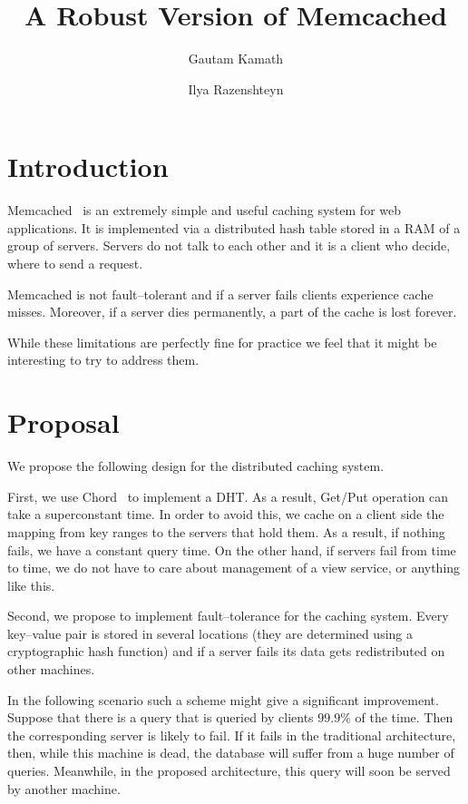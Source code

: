 \documentclass[letterpaper,11pt]{article}
\begin{document}
    \title{A Robust Version of Memcached}
    \author{Gautam Kamath \and Ilya Razenshteyn}
    \maketitle

    \section{Introduction}

    Memcached~\cite{} is an extremely simple and useful caching system for web applications. It is implemented
    via a distributed hash table stored in a RAM of a group of servers.
    Servers do not talk to each other and it is
    a client who decide, where to send a request.

    Memcached is not fault--tolerant and if a server fails clients experience cache misses. Moreover, if a server
    dies permanently, a part of the cache is lost forever.

    While these limitations are perfectly fine for practice we feel that it might be interesting
    to try to address them.

    \section{Proposal}

    We propose the following design for the distributed caching system.

    First, we use Chord~\cite{} to implement a DHT.
    As a result, Get/Put operation can take a superconstant time. In order to avoid this, we cache on a client 
    side the mapping from key ranges to the servers that hold them. As a result, if nothing fails, we have a
    constant query time. On the other hand, if servers fail from time to time,
    we do not have to care about management of a view service, or anything like this.

    Second, we propose to implement fault--tolerance for the caching system. Every key--value pair is stored in
    several locations (they are determined using a cryptographic hash function) and if a server fails its data
    gets redistributed on other machines.

    In the following scenario such a scheme might give a significant improvement. Suppose that there is a query
    that is queried by clients $99.9\%$ of the time. Then the corresponding server is likely to fail. If it fails
    in the traditional architecture, then, while this machine is dead, the database will suffer from a huge
    number of queries. Meanwhile, in the proposed architecture, this query will soon be served by another machine.
\end{document}
